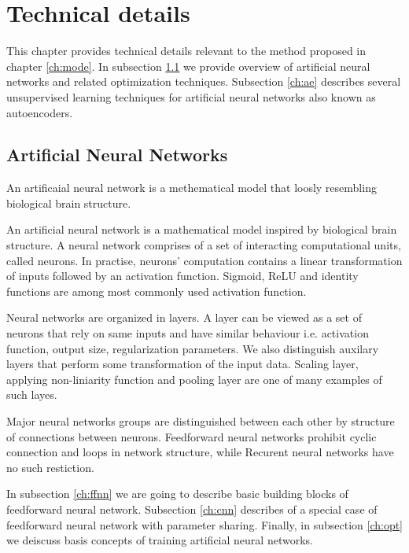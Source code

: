 
\chapter{Technical details}
\label{ch:tede}

This chapter provides technical details relevant to the method proposed in chapter \ref{ch:mode}.
In subsection \ref{ch:nn} we provide overview of artificial neural networks and related optimization techniques.
Subsection \ref{ch:ae} describes several unsupervised learning techniques for artificial neural networks also known as autoencoders.

\section{Artificial Neural Networks}
\label{ch:nn}
An artificaial neural network is a methematical model that loosly resembling biological brain structure.

An artificial neural network is a mathematical model inspired by biological brain structure.
A neural network comprises of a set of interacting computational units, called neurons.
In practise, neurons' computation contains a linear transformation of inputs followed by an activation function.
Sigmoid, ReLU and identity functions are among most commonly used activation function.

Neural networks are organized in layers.
A layer can be viewed as a set of neurons that rely on same inputs and have similar behaviour i.e. activation function, output size, regularization parameters.
We also distinguish auxilary layers that perform some transformation of the input data.
Scaling layer, applying non-liniarity function and pooling layer are one of many examples of such layes.

Major neural networks groups are distinguished between each other by structure of connections between neurons.
Feedforward neural networks prohibit cyclic connection and loops in network structure, while Recurent neural networks have no such restiction.

In subsection \ref{ch:ffnn} we are going to describe basic building blocks of feedforward neural network.
Subsection \ref{ch:cnn} describes of a special case of feedforward neural network with parameter sharing.
Finally, in subsection \ref{ch:opt} we deiscuss basis concepts of training artificial neural networks.

